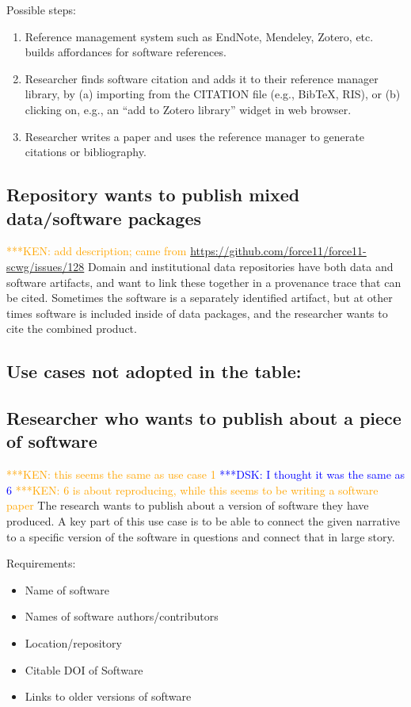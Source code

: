 \documentclass[12pt, oneside]{amsart}
\newcommand{\katznote}[1]{ {\textcolor{blue} { ***DSK: #1 }}} %
\newcommand{\niemnote}[1]{ {\textcolor{orange} { ***KEN: #1 }}} %
\begin{document}
Possible steps:
\begin{enumerate}
\item Reference management system such as EndNote, Mendeley, Zotero, etc. builds affordances for software references.
\item Researcher finds software citation and adds it to their reference manager library, by (a) importing from the CITATION file (e.g., BibTeX, RIS), or (b) clicking on, e.g., an ``add to Zotero library'' widget in web browser.
\item Researcher writes a paper and uses the reference manager to generate citations or bibliography.
\end{enumerate}

\subsection{Repository wants to publish mixed data\slash software packages}

\niemnote{add description; came from \url{https://github.com/force11/force11-scwg/issues/128}}
Domain and institutional data repositories have both data and software
artifacts, and want to link these together in a provenance trace that can
be cited. Sometimes the software is a separately identified artifact, but at
other times software is included inside of data packages, and the researcher
wants to cite the combined product.

\subsection*{Use cases not adopted in the table:}

\subsection{Researcher who wants to publish about a piece of software}

\niemnote{this seems the same as use case 1} \katznote{I thought it was the same as 6}
\niemnote{6 is about reproducing, while this seems to be writing a software paper}
The research wants to publish about a version of software they have produced.
A key part of this use case is to be able to connect the given narrative to a specific version of the software in questions and connect that in large story.

Requirements:
\begin{itemize}
\item Name of software
\item Names of software authors/contributors
\item Location/repository
\item Citable DOI of Software
\item Links to older versions of software
\end{itemize}
\end{document}
